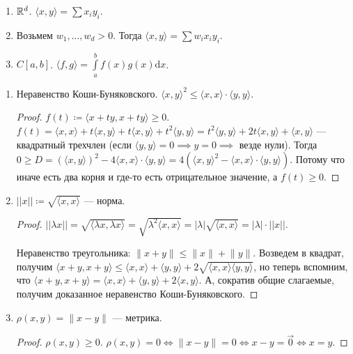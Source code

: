 \begin{example}
    \begin{enumerate}
        \item $\mathbb{R}^d$.  $\langle x, y\rangle = \sum x_iy_i$.
        \item Возьмем $w_1, \ldots, w_d > 0$. Тогда $\langle x, y \rangle = \sum w_i x_i y_i$.
        \item $C[a, b]$.  $\langle f, g \rangle = \int\limits_a^b f(x)g(x) \mathrm{d}x$.
    \end{enumerate}
\end{example}
\begin{properties}
    \begin{enumerate}
        \item Неравенство Коши-Буняковского. $\langle x, y \rangle^2 \le \langle x, x \rangle \cdot \langle y, y\rangle$.
            \begin{proof}
                $f(t) \coloneqq \langle x+ty, x +ty \rangle \ge 0$. $f(t) = \langle x, x \rangle + t\langle x, y \rangle + t\langle x, y \rangle + t^2 \langle y, y \rangle = t^2 \langle y, y\rangle + 2t\langle x, y \rangle + \langle x, y \rangle$ --- квадратный трехчлен (если $\langle y, y \rangle = 0 \implies y = 0 \implies$ везде нули). Тогда $0 \ge D= (\langle x, y \rangle)^2 - 4 \langle x, x\rangle \cdot \langle y, y \rangle = 4(\langle x, y \rangle^2 - \langle x, x\rangle \cdot \langle y, y \rangle)$. Потому что иначе есть два корня и где-то есть отрицательное значение, а $f(t) \geq 0$.
            \end{proof}
        \item $||x|| \coloneqq \sqrt{\langle x, x \rangle}$ --- норма.
             \begin{proof}
                $||\lambda x|| = \sqrt{\langle \lambda x, \lambda x\rangle} = \sqrt{\lambda^2\langle x, x \rangle} = |\lambda| \sqrt{\langle x, x \rangle} = |\lambda| \cdot ||x||$.

                Неравенство треугольника: $\lVert x+y \rVert \le \lVert x \rVert + \lVert y \rVert$.
                Возведем в квадрат, получим $\langle x + y, x + y\rangle \le \langle x, x\rangle + \langle y, y\rangle + 2\sqrt{\langle x, x\rangle\langle y, y\rangle}$, но теперь вспомним, что $\langle x + y, x + y\rangle = \langle x, x\rangle + \langle y, y\rangle + 2\langle x, y\rangle$.
                А, сократив общие слагаемые, получим доказанное неравенство Коши-Буняковского.
            \end{proof}
        \item $\rho(x, y) = \lVert x - y \rVert$ --- метрика.
            \begin{proof}
                $\rho(x, y) \ge 0$. $\rho(x, y) = 0 \iff \lVert x - y \rVert = 0 \iff x - y = \overrightarrow{0} \iff x = y$.


\end{proof}
\end{enumerate}
\end{properties}
